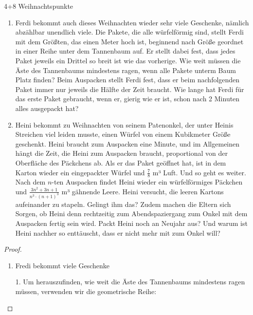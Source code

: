 \documentclass{problemset}
\begin{document}
\begin{problem}[Weihnachtsaufgaben*]{4+8 Weihnachtspunkte}
\begin{enumerate}
    \item Ferdi bekommt auch dieses Weihnachten wieder sehr viele Geschenke, nämlich
          abzählbar unendlich viele. Die Pakete, die alle würfelförmig sind, stellt Ferdi
          mit dem Größten, das einen Meter hoch ist, beginnend nach Größe geordnet in
          einer Reihe unter dem Tannenbaum auf. Er stellt dabei fest, dass jedes Paket
          jeweils ein Drittel so breit ist wie das vorherige. Wie weit müssen die Äste
          des Tannenbaums mindestens ragen, wenn alle Pakete unterm Baum Platz finden?
          Beim Auspacken stellt Ferdi fest, dass er beim nachfolgenden Paket immer nur
          jeweils die Hälfte der Zeit braucht. Wie lange hat Ferdi für das erste Paket
          gebraucht, wenn er, gierig wie er ist, schon nach 2 Minuten alles ausgepackt
          hat?
    \item Heini bekommt zu Weihnachten von seinem Patenonkel, der unter Heinis Streichen
          viel leiden musste, einen Würfel von einem Kubikmeter Größe geschenkt. Heini
          braucht zum Auspacken eine Minute, und im Allgemeinen hängt die Zeit, die Heini
          zum Auspacken braucht, proportional von der Oberfläche des Päckchens ab. Als er
          das Paket geöffnet hat, ist in dem Karton wieder ein eingepackter Würfel und
          $\frac{7}{8}$ m³ Luft. Und so geht es weiter. Nach dem $n$-ten Auspacken findet
          Heini wieder ein würfelförmiges Päckchen und
          $\frac{3n^2+3n+1}{n^3\cdot(n+1)^3}$ m³ gähnende Leere. Heini versucht, die
          leeren Kartons aufeinander zu stapeln. Gelingt ihm das? Zudem machen die Eltern
          sich Sorgen, ob Heini denn rechtzeitig zum Abendspaziergang zum Onkel mit dem
          Auspacken fertig sein wird. Packt Heini noch an Neujahr aus? Und warum ist
          Heini nachher so enttäuscht, dass er nicht mehr mit zum Onkel will?
\end{enumerate}

\begin{proof}
    $ $

    \begin{enumerate}
        \item Fredi bekommt viele Geschenke

              1. Um herauszufinden, wie weit die Äste des Tannenbaums mindestens ragen müssen, verwenden wir die geometrische Reihe:


\end{enumerate}
\end{proof}
\end{problem}
\end{document}
